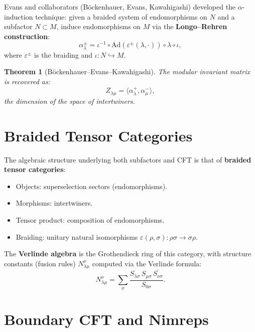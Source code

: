 \documentclass[11pt,a4paper]{article}
\newtheorem{theorem}{Theorem}[section]
\begin{document}
Evans and collaborators (B\"ockenhauer, Evans, Kawahigashi) developed
the $\alpha$-induction technique: given a braided system of endomorphisms
on $N$ and a subfactor $N \subset M$, induce endomorphisms on $M$ via
the \textbf{Longo--Rehren construction}:
\begin{equation}
  \alpha^\pm_\lambda = \iota^{-1} \circ \mathrm{Ad}(\varepsilon^\pm(\lambda, \cdot))
  \circ \lambda \circ \iota,
\end{equation}
where $\varepsilon^\pm$ is the braiding and $\iota: N \hookrightarrow M$.

\begin{theorem}[B\"ockenhauer--Evans--Kawahigashi]
The modular invariant matrix is recovered as:
\[
  Z_{\lambda\mu} = \langle \alpha^+_\lambda, \alpha^-_\mu \rangle,
\]
the dimension of the space of intertwiners.
\end{theorem}

\section{Braided Tensor Categories}

The algebraic structure underlying both subfactors and CFT is that of
\textbf{braided tensor categories}:
\begin{itemize}[nosep]
  \item Objects: superselection sectors (endomorphisms).
  \item Morphisms: intertwiners.
  \item Tensor product: composition of endomorphisms.
  \item Braiding: unitary natural isomorphisms $\varepsilon(\rho, \sigma):
        \rho\sigma \to \sigma\rho$.
\end{itemize}

The \textbf{Verlinde algebra} is the Grothendieck ring of this category,
with structure constants (fusion rules) $N_{\lambda\mu}^\nu$ computed
via the Verlinde formula:
\begin{equation}
  N_{\lambda\mu}^\nu = \sum_\sigma \frac{S_{\lambda\sigma}\, S_{\mu\sigma}\,
  \overline{S_{\nu\sigma}}}{S_{0\sigma}}.
\end{equation}

\section{Boundary CFT and Nimreps}
\end{document}
